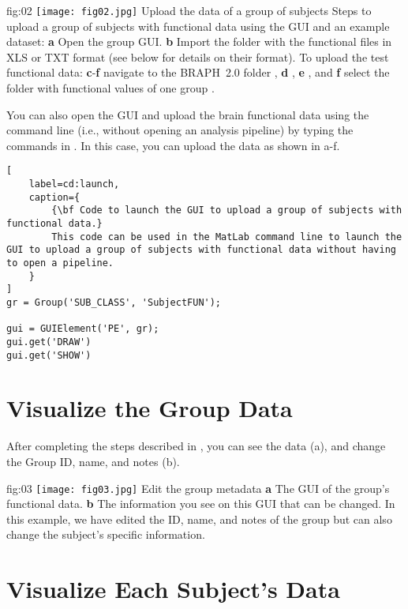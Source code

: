 \documentclass[justified]{tufte-handout}
\begin{document}
	{fig:02}
	{
	\texttt{[image: fig02.jpg]}
	}
	{Upload the data of a group of subjects}
	{
	Steps to upload a group of subjects with functional data using the GUI and an example dataset: 
	{\bf a} Open the group GUI.
	{\bf b} Import the folder with the functional files in XLS or TXT format (see below for details on their format).
	To upload the test functional data:
	{\bf c}-{\bf f} navigate to the BRAPH~2.0 folder , {\bf d} ,  {\bf e} , and {\bf f} select the folder with functional values of one group .
	}
	
\begin{tcolorbox}[
	title=GUI launch from command line
]
You can also open the GUI and upload the brain functional data using the command line (i.e., without opening an analysis pipeline) by typing the commands in . In this case, you can upload the data as shown in a-f.
%
\begin{lstlisting}[
	label=cd:launch,
	caption={
		{\bf Code to launch the GUI to upload a group of subjects with functional data.}
		This code can be used in the MatLab command line to launch the GUI to upload a group of subjects with functional data without having to open a pipeline.
	}
]
gr = Group('SUB_CLASS', 'SubjectFUN');

gui = GUIElement('PE', gr);
gui.get('DRAW')
gui.get('SHOW')
\end{lstlisting}
\end{tcolorbox}

\section{Visualize the Group Data}

After completing the steps described in , you can see the data (a), and change the Group ID, name, and notes (b). 

	{fig:03}
	{
	\texttt{[image: fig03.jpg]}
	}
	{Edit the group metadata}
	{ 
	{\bf a} The GUI of the group's functional data. 
	{\bf b} The information you see on this GUI that can be changed. In this example, we have edited the ID, name, and notes of the group but can also change the subject's specific information.
	}

\section{Visualize Each Subject's Data}
\end{document}
